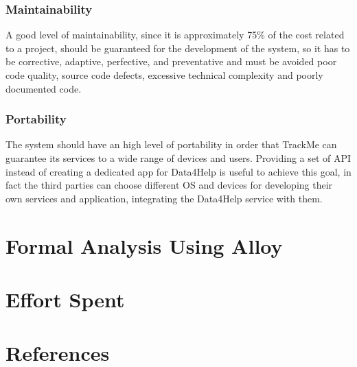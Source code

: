 \documentclass[a4paper]{article}
\begin{document}
    \subsubsection{Maintainability}
    
    A good level of maintainability, since it is approximately 75\% of the cost related to a project, should be guaranteed for the development of the system, so it has to be corrective, adaptive, perfective, and preventative and
    must be avoided poor code quality, source code defects, excessive technical complexity and poorly documented code.
    
    \subsubsection{Portability}
    
    The system should have an high level of portability in order that TrackMe can guarantee its services to a wide range of devices and users.
    Providing a set of API instead of creating a dedicated app for Data4Help is useful to achieve this goal, in fact the third parties can choose different OS and devices for developing their own services and application, integrating the Data4Help service with them.
    \section{Formal Analysis Using Alloy}
    
    \section{Effort Spent}
    
    \section{References}
    
    
    
\end{document}
